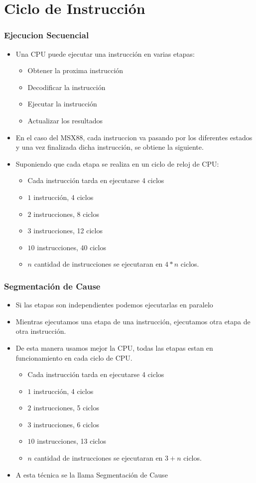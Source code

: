 \documentclass{beamer}
\begin{document}
\section{Ciclo de Instrucción}
\begin{frame}
\frametitle{Ejecucion Secuencial}
\begin{itemize}
\item Una CPU puede ejecutar una instrucción en varias etapas:
\begin{itemize}
  \item Obtener la proxima instrucción
  \item Decodificar la instrucción
  \item Ejecutar la instrucción
  \item Actualizar los resultados
\end{itemize}
\item En el caso del MSX88, cada instruccion va pasando por los diferentes estados y una vez finalizada dicha instrucción, se obtiene la siguiente.
\item Suponiendo que cada etapa se realiza en un ciclo de reloj de CPU:
\begin{itemize}
  \item Cada instrucción tarda en ejecutarse 4 ciclos
  \item $1$ instrucción, 4 ciclos
  \item $2$ instrucciones, 8 ciclos
  \item $3$ instrucciones, 12 ciclos
  \item $10$ instrucciones, 40 ciclos
  \item $n$ cantidad de instrucciones se ejecutaran en $4 * n$ ciclos.
\end{itemize}
\end{itemize}
\end{frame}

\begin{frame}
\frametitle{Segmentación de Cause}
\begin{itemize}
\item Si las etapas son independientes podemos ejecutarlas en paralelo
\item Mientras ejecutamos una etapa de una instrucción, ejecutamos otra etapa de otra instrucción.
\item De esta manera usamos mejor la CPU, todas las etapas estan en funcionamiento en cada ciclo de CPU.
\begin{itemize}
  \item Cada instrucción tarda en ejecutarse 4 ciclos
  \item $1$ instrucción, 4 ciclos
  \item $2$ instrucciones, 5 ciclos
  \item $3$ instrucciones, 6 ciclos
  \item $10$ instrucciones, 13 ciclos
  \item $n$ cantidad de instrucciones se ejecutaran en $3 + n$ ciclos.
\end{itemize}
\item A esta técnica se la llama Segmentación de Cause
\end{itemize}
\end{frame}
\end{document}
